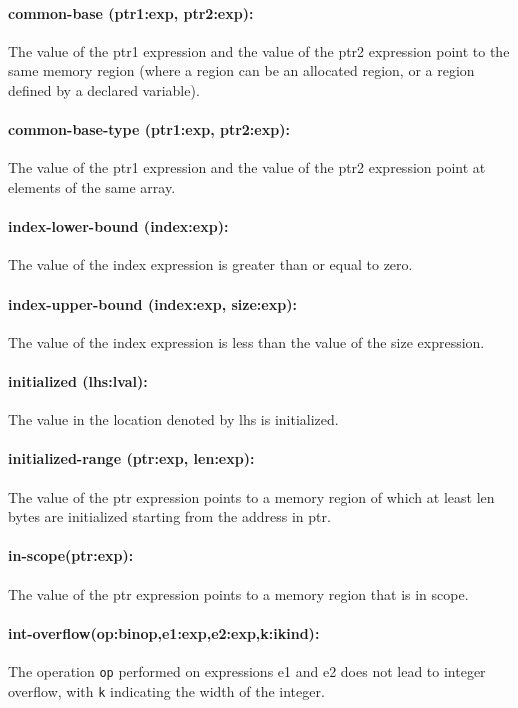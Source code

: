 \documentclass[11pt]{article}
\begin{document}
\paragraph{common-base (ptr1:exp, ptr2:exp): }
The value of the ptr1 expression and the value of the ptr2 expression
   point to the same memory region (where a region can be an allocated region, or a region
   defined by a declared variable).
   
\paragraph{common-base-type (ptr1:exp, ptr2:exp): }
The value of the ptr1 expression and the value of the ptr2 expression
  point at elements of the same array.

\paragraph{index-lower-bound (index:exp): }
The value of the index expression is greater than or equal to zero.

\paragraph{index-upper-bound (index:exp, size:exp):}
The value of the index expression is less than the value of the
   size expression. 

\paragraph{initialized (lhs:lval): }
The value in the location denoted by lhs is initialized.

\paragraph{initialized-range (ptr:exp, len:exp): }
The value of the ptr expression points to a memory region of which at least
len bytes are initialized starting from the address in ptr.

\paragraph{in-scope(ptr:exp): }
The value of the ptr expression points to a memory region that is in scope.

\paragraph{int-overflow(op:binop,e1:exp,e2:exp,k:ikind): }
The operation {\tt op} performed on expressions e1 and e2 does not lead to
integer overflow, with {\tt k} indicating the width of the integer.
\end{document}
